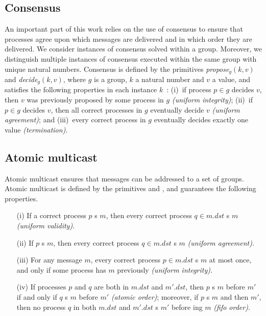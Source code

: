 \documentclass[times, 10pt]{article}
\begin{document}
\subsection{Consensus}

An important part of this work relies on the use of consensus to ensure that processes agree upon which messages are delivered and in which order they are delivered. We consider instances of consensus solved within a group. Moreover, we distinguish multiple instances of consensus executed within the same group with unique natural numbers.
Consensus is defined by the primitives \textit{propose$_g(k, v)$} and \textit{decide$_g(k, v)$}, where $g$ is a group, $k$ a natural number and $v$ a value, and satisfies the following properties in each instance $k$~\cite{hadzilacos1993ftb}:
(i)~if process $p \in g$ decides $v$, then $v$ was previously proposed by some process in $g$ \emph{(uniform integrity)}; 
(ii)~if $p \in g$ decides $v$, then all correct processes in $g$ eventually decide $v$ \emph{(uniform agreement)}; and 
(iii)~every correct process in $g$ eventually decides exactly one value \emph{(termination)}.


\subsection{Atomic multicast}

Atomic multicast ensures that messages can be addressed to a set of groups. %
Atomic multicast is defined by the primitives  and , and guarantees the following properties.

\begin{itemize}
\item[(i)] If a correct process $p$ \amcast{}s $m$, then every correct process $q \in m.dst$ \amdel{}s $m$ \emph{(uniform validity)}.

\item[(ii)] If $p$ \amdel{}s $m$, then every correct process $q \in m.dst$ \amdel{}s $m$ \emph{(uniform agreement)}.

\item[(iii)] For any message $m$, every correct process $p \in m.dst$ \amdel{}s $m$ at most once, and only if some process has \amcast{} $m$ previously \emph{(uniform integrity)}.

\item[(iv)] If processes $p$ and $q$ are both in $m.dst$ and $m'.dst$, then $p$ \amdel{}s $m$ before $m'$ if and only if $q$ \amdel{}s $m$ before $m'$ \emph{(atomic order)}; moreover, if $p$ \amcast{}s $m$ and then $m'$, then no process $q$ in both $m.dst$ and $m'.dst$ \amdel{}s $m'$ before \amdel{}ing $m$ \emph{(fifo order)}.
\end{itemize} 
\end{document}
